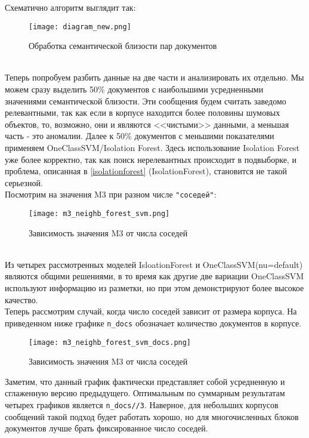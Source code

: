 \documentclass{article}
\begin{document}
Схематично алгоритм выглядит так:
\newpage
\begin{figure}[!htb]
    \center
        \texttt{[image: diagram\_new.png]}
        \caption{Обработка семантической близости пар документов}
\end{figure}\\

Теперь попробуем разбить данные на две части и анализировать их отдельно. Мы можем сразу выделить 50\% документов с наибольшими усредненными значениями семантической близости. Эти сообщения будем считать заведомо релевантными, так как если в корпусе находится более половины шумовых объектов, то, возможно, они и являются <<чистыми>> данными, а меньшая часть - это аномалии. Далее к 50\%  документов с меньшими показателями применяем OneClassSVM/Isolation Forest. Здесь использование Isolation Forest уже более корректно, так как поиск нерелевантных происходит в подвыборке, и проблема, описанная в \textcolor{cyan}{\ref{isolationforest}} (IsolationForest), становится не такой серьезной.\\

Посмотрим на значения M3 при разном числе \verb|"соседей"|:
\begin{figure}[!htb]
    \center
        \texttt{[image: m3\_neighb\_forest\_svm.png]}
        \caption{Зависимость значения M3 от числа соседей}
\end{figure}\\

Из четырех рассмотренных моделей IsloationForest и OneClassSVM(nu=default) являются общими решениями, в то время как другие две вариации OneClassSVM используют информацию из разметки, но при этом демонстрируют более высокое качество.\\

Теперь рассмотрим случай, когда число соседей зависит от размера корпуса. На приведенном ниже графике \verb|n_docs| обозначает количество документов в корпусе.
\newpage
\begin{figure}[!htb]
    \center
        \texttt{[image: m3\_neighb\_forest\_svm\_docs.png]}
        \caption{Зависимость значения M3 от числа соседей}
\end{figure}

Заметим, что данный график фактически представляет собой усредненную и сглаженную версию предыдущего. Оптимальным по суммарным результатам четырех графиков является \verb|n_docs//3|. Наверное, для небольших корпусов сообщений такой подход будет работать хорошо, но для многочисленных блоков документов лучше брать фиксированное число соседей.
\end{document}
